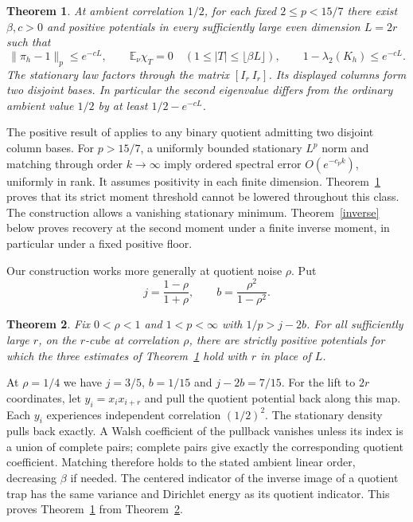 \documentclass[11pt]{article}
\newtheorem{theorem}{Theorem}
\newcommand{\E}{\mathbb E}
\begin{document}
\begin{theorem}\label{two}
At ambient correlation $1/2$, for each fixed $2\le p<15/7$ there exist $\beta,c>0$ and positive potentials in every sufficiently large even dimension $L=2r$ such that
\[
 \|\pi_h-1\|_{p}\le e^{-cL},\qquad
 \E_\nu\chi_T=0\quad(1\le |T|\le\lfloor\beta L\rfloor),\qquad
 1-\lambda_2(K_h)\le e^{-cL}.
\]
The stationary law factors through the matrix $[I_r\ I_r]$. Its displayed columns form two disjoint bases. In particular the second eigenvalue differs from the ordinary ambient value $1/2$ by at least $1/2-e^{-cL}$.
\end{theorem}

The positive result of \cite[section 7]{companion} applies to any binary quotient admitting two disjoint column bases. For $p>15/7$, a uniformly bounded stationary $L^p$ norm and matching through order $k\to\infty$ imply ordered spectral error $O(e^{-c_p k})$, uniformly in rank. It assumes positivity in each finite dimension. Theorem~\ref{two} proves that its strict moment threshold cannot be lowered throughout this class. The construction allows a vanishing stationary minimum. Theorem~\ref{inverse} below proves recovery at the second moment under a finite inverse moment, in particular under a fixed positive floor.

Our construction works more generally at quotient noise $\rho$. Put
\[
 j=\frac{1-\rho}{1+\rho},\qquad b=\frac{\rho^2}{1-\rho^2}.
\]
\begin{theorem}\label{general}
Fix $0<\rho<1$ and $1<p<\infty$ with $1/p>j-2b$. For all sufficiently large $r$, on the $r$-cube at correlation $\rho$, there are strictly positive potentials for which the three estimates of Theorem~\ref{two} hold with $r$ in place of $L$.
\end{theorem}
At $\rho=1/4$ we have $j=3/5$, $b=1/15$ and $j-2b=7/15$. For the lift to $2r$ coordinates, let $y_i=x_i x_{i+r}$ and pull the quotient potential back along this map. Each $y_i$ experiences independent correlation $(1/2)^2$. The stationary density pulls back exactly. A Walsh coefficient of the pullback vanishes unless its index is a union of complete pairs; complete pairs give exactly the corresponding quotient coefficient. Matching therefore holds to the stated ambient linear order, decreasing $\beta$ if needed. The centered indicator of the inverse image of a quotient trap has the same variance and Dirichlet energy as its quotient indicator. This proves Theorem~\ref{two} from Theorem~\ref{general}.
\end{document}
